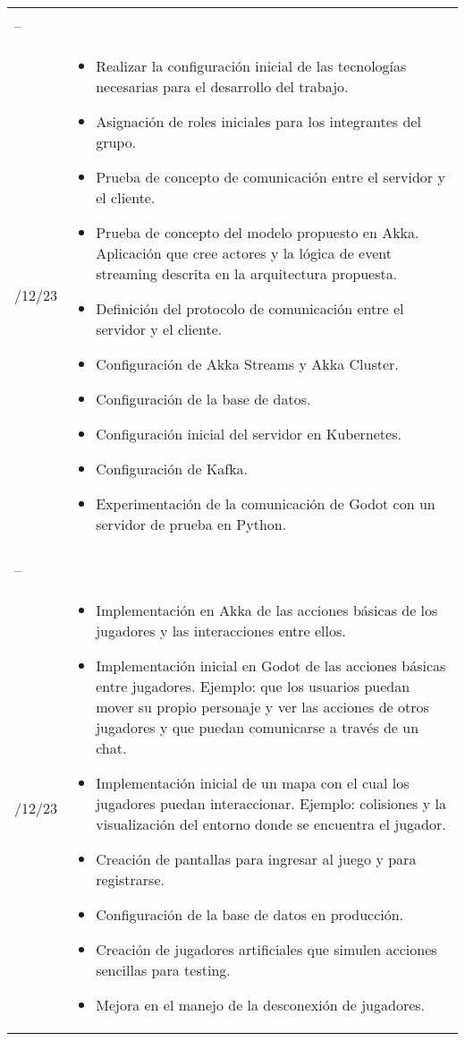 \begin{longtable}{|>{\centering\arraybackslash}p{3cm}|>{\centering\arraybackslash}p{\dimexpr\textwidth-4cm\relax}|}
    \multirow{3}{3cm}{\centering 10/11/23 \\ -- \\ 6/12/23} &
    \begin{itemize}[left=0pt]
        \item Realizar la configuración inicial de las tecnologías necesarias para el desarrollo del trabajo.
        \item Asignación de roles iniciales para los integrantes del grupo.
        \item Prueba de concepto de comunicación entre el servidor y el cliente.
        \item Prueba de concepto del modelo propuesto en Akka. Aplicación que cree actores y la lógica de event streaming descrita en la arquitectura propuesta.
        \item Definición del protocolo de comunicación entre el servidor y el cliente.
        \item Configuración de Akka Streams y Akka Cluster.
        \item Configuración de la base de datos.
        \item Configuración inicial del servidor en Kubernetes.
        \item Configuración de Kafka.
        \item Experimentación de la comunicación de Godot con un servidor de prueba en Python.
    \end{itemize} \\ \hline

    \multirow{3}{3cm}{\centering 7/12/23 \\ -- \\ 31/12/23} &
    \begin{itemize}[left=0pt]
        \item Implementación en Akka de las acciones básicas de los jugadores y las interacciones entre ellos.
        \item Implementación inicial en Godot de las acciones básicas entre jugadores. Ejemplo: que los usuarios puedan mover su propio personaje y ver las acciones de otros jugadores y que puedan comunicarse a través de un chat.
        \item Implementación inicial de un mapa con el cual los jugadores puedan interaccionar. Ejemplo: colisiones y la visualización del entorno donde se encuentra el jugador.
        \item Creación de pantallas para ingresar al juego y para registrarse.
        \item Configuración de la base de datos en producción.
        \item Creación de jugadores artificiales que simulen acciones sencillas para testing.
        \item Mejora en el manejo de la desconexión de jugadores.
    \end{itemize} \\ \hline


\end{longtable}

